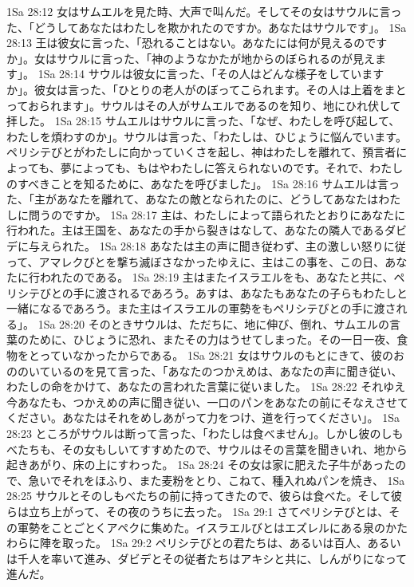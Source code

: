 1Sa 28:12  女はサムエルを見た時、大声で叫んだ。そしてその女はサウルに言った、「どうしてあなたはわたしを欺かれたのですか。あなたはサウルです」。
1Sa 28:13  王は彼女に言った、「恐れることはない。あなたには何が見えるのですか」。女はサウルに言った、「神のようなかたが地からのぼられるのが見えます」。
1Sa 28:14  サウルは彼女に言った、「その人はどんな様子をしていますか」。彼女は言った、「ひとりの老人がのぼってこられます。その人は上着をまとっておられます」。サウルはその人がサムエルであるのを知り、地にひれ伏して拝した。
1Sa 28:15  サムエルはサウルに言った、「なぜ、わたしを呼び起して、わたしを煩わすのか」。サウルは言った、「わたしは、ひじょうに悩んでいます。ペリシテびとがわたしに向かっていくさを起し、神はわたしを離れて、預言者によっても、夢によっても、もはやわたしに答えられないのです。それで、わたしのすべきことを知るために、あなたを呼びました」。
1Sa 28:16  サムエルは言った、「主があなたを離れて、あなたの敵となられたのに、どうしてあなたはわたしに問うのですか。
1Sa 28:17  主は、わたしによって語られたとおりにあなたに行われた。主は王国を、あなたの手から裂きはなして、あなたの隣人であるダビデに与えられた。
1Sa 28:18  あなたは主の声に聞き従わず、主の激しい怒りに従って、アマレクびとを撃ち滅ぼさなかったゆえに、主はこの事を、この日、あなたに行われたのである。
1Sa 28:19  主はまたイスラエルをも、あなたと共に、ペリシテびとの手に渡されるであろう。あすは、あなたもあなたの子らもわたしと一緒になるであろう。また主はイスラエルの軍勢をもペリシテびとの手に渡される」。
1Sa 28:20  そのときサウルは、ただちに、地に伸び、倒れ、サムエルの言葉のために、ひじょうに恐れ、またその力はうせてしまった。その一日一夜、食物をとっていなかったからである。
1Sa 28:21  女はサウルのもとにきて、彼のおののいているのを見て言った、「あなたのつかえめは、あなたの声に聞き従い、わたしの命をかけて、あなたの言われた言葉に従いました。
1Sa 28:22  それゆえ今あなたも、つかえめの声に聞き従い、一口のパンをあなたの前にそなえさせてください。あなたはそれをめしあがって力をつけ、道を行ってください」。
1Sa 28:23  ところがサウルは断って言った、「わたしは食べません」。しかし彼のしもべたちも、その女もしいてすすめたので、サウルはその言葉を聞きいれ、地から起きあがり、床の上にすわった。
1Sa 28:24  その女は家に肥えた子牛があったので、急いでそれをほふり、また麦粉をとり、こねて、種入れぬパンを焼き、
1Sa 28:25  サウルとそのしもべたちの前に持ってきたので、彼らは食べた。そして彼らは立ち上がって、その夜のうちに去った。
1Sa 29:1  さてペリシテびとは、その軍勢をことごとくアペクに集めた。イスラエルびとはエズレルにある泉のかたわらに陣を取った。
1Sa 29:2  ペリシテびとの君たちは、あるいは百人、あるいは千人を率いて進み、ダビデとその従者たちはアキシと共に、しんがりになって進んだ。

